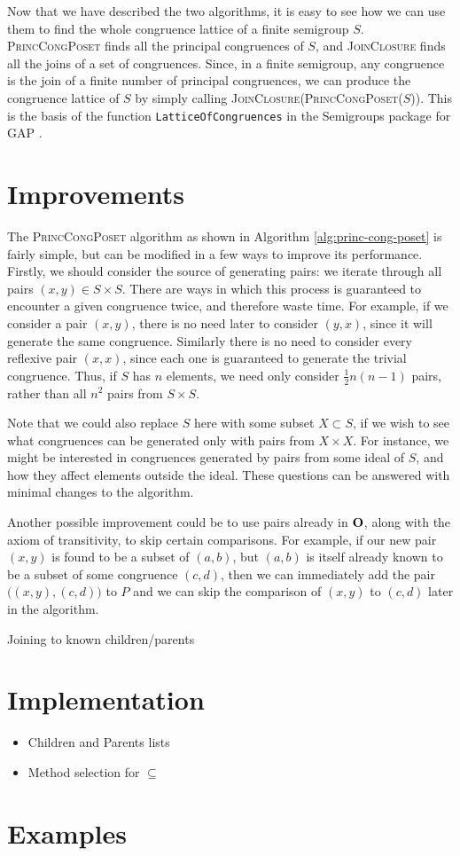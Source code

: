 Now that we have described the two algorithms, it is easy to see how we can use
them to find the whole congruence lattice of a finite semigroup $S$.
\textsc{PrincCongPoset} finds all the principal congruences of $S$, and
\textsc{JoinClosure} finds all the joins of a set of congruences.  Since, in a
finite semigroup, any congruence is the join of a finite number of principal
congruences, we can produce the congruence lattice of $S$ by simply calling
\textsc{JoinClosure(PrincCongPoset($S$))}.  This is the basis of the function
\texttt{LatticeOfCongruences} in the Semigroups package for GAP
\cite{semigroups}.

\section{Improvements}
\label{sec:lattice-improvements}

The \textsc{PrincCongPoset} algorithm as shown in Algorithm
\ref{alg:princ-cong-poset} is fairly simple, but can be modified in a few ways
to improve its performance.  Firstly, we should consider the source of
generating pairs: we iterate through all pairs $(x,y) \in S \times S$.  There
are ways in which this process is guaranteed to encounter a given congruence
twice, and therefore waste time.  For example, if we consider a pair $(x,y)$,
there is no need later to consider $(y,x)$, since it will generate the same
congruence.  Similarly there is no need to consider every reflexive pair
$(x,x)$, since each one is guaranteed to generate the trivial congruence.  Thus,
if $S$ has $n$ elements, we need only consider $\frac{1}{2}n(n-1)$ pairs, rather
than all $n^2$ pairs from $S \times S$.

Note that we could also replace $S$ here with some subset $X \subset S$, if we
wish to see what congruences can be generated only with pairs from $X \times X$.
For instance, we might be interested in congruences generated by pairs from some
ideal of $S$, and how they affect elements outside the ideal.  These questions
can be answered with minimal changes to the algorithm.

Another possible improvement could be to use pairs already in $\mathbf{O}$, along with
the axiom of transitivity, to skip certain comparisons.  For example, if our new
pair $(x,y)$ is found to be a subset of $(a,b)$, but $(a,b)$ is itself already
known to be a subset of some congruence $(c,d)$, then we can immediately add the
pair $\big((x,y), (c,d)\big)$ to $P$ and we can skip the comparison of $(x,y)$
to $(c,d)$ later in the algorithm.

Joining to known children/parents

\section{Implementation}
\label{sec:lattice-implementation}
\begin{itemize}
\item Children and Parents lists
\item Method selection for $\subseteq$
\end{itemize}

\section{Examples}
\label{sec:lattice-examples}
